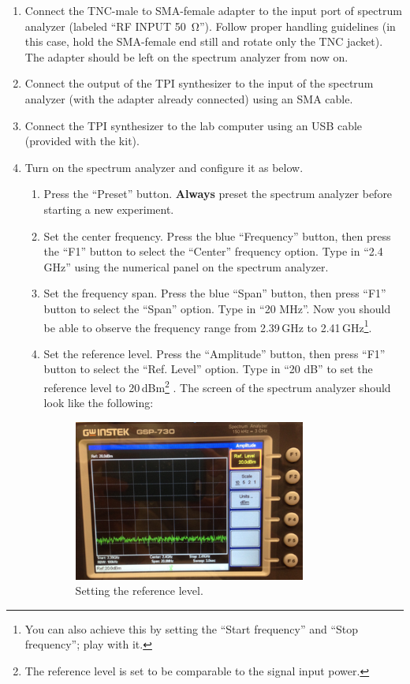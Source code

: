 \documentclass[letterpaper, 11pt]{article}
\begin{document}
\begin{enumerate}
	\item Connect the TNC-male to SMA-female adapter to the input port of spectrum analyzer (labeled ``RF INPUT \SI{50}{\ohm}''). Follow proper handling guidelines (in this case, hold the SMA-female end still and rotate only the TNC jacket). The adapter should be left on the spectrum analyzer from now on. 
	
	\item Connect the output of the TPI synthesizer to the input of the spectrum analyzer (with the adapter already connected) using an SMA cable.
	
	\item Connect the TPI synthesizer to the lab computer using an USB cable (provided with the kit).
	
	\item Turn on the spectrum analyzer and configure it as below.
		\begin{enumerate}
			\item Press the ``Preset'' button. \textbf{Always} preset the spectrum analyzer before starting a new experiment.
			
			\item Set the center frequency. Press the blue ``Frequency'' button, then press the ``F1'' button to select the ``Center'' frequency option. Type in ``2.4 GHz'' using the numerical panel on the spectrum analyzer. 
			
			\item Set the frequency span.  Press the blue ``Span'' button, then press ``F1'' button to select the ``Span'' option. Type in ``20 MHz''. Now you should be able to observe the frequency range from 2.39\,GHz to 2.41\,GHz\footnote{You can also achieve this by setting the ``Start frequency'' and ``Stop frequency''; play with it.}. 
			
			\item Set the reference level. Press the ``Amplitude'' button, then press ``F1'' button to select the ``Ref. Level'' option. Type in ``20 dB'' to set the reference level to 20\,dBm\footnote{The reference level is set to be comparable to the signal input power.} . The screen of the spectrum analyzer should look like the following: 
				\begin{figure}[h]
					\centering
					\includegraphics[width=3in]{sa-reference}
					\caption{Setting the reference level.}
					\label{fig:sa-reference}
				\end{figure}
		\end{enumerate}
		

\end{enumerate}
\end{document}
